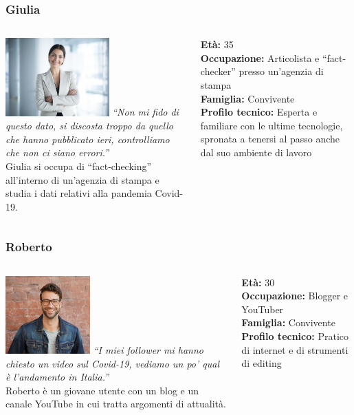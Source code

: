 \documentclass[handout]{beamer}
\begin{document}
		\begin{frame}
			\frametitle{Giulia}
			\begin{columns}[t]
				\begin{column}[T]{6cm}
					\includegraphics[height=3cm]{img/giulia}
					\textit{``Non mi fido di questo dato, si discosta troppo da quello che hanno pubblicato ieri, controlliamo che non ci siano errori.''}\\
					Giulia si occupa di ``fact-checking'' all'interno di un'agenzia di stampa e studia i dati relativi alla pandemia Covid-19.
				\end{column}
				\begin{column}[T]{5cm}
					\textbf{Età:} 35\\
					\textbf{Occupazione:} Articolista e ``fact-checker'' presso un'agenzia di stampa\\
					\textbf{Famiglia:} Convivente\\
					\textbf{Profilo tecnico:} Esperta e familiare con le ultime tecnologie, spronata a tenersi al passo anche dal suo ambiente di lavoro\\
				\end{column}
			\end{columns}
		\end{frame}

		\begin{frame}
			\frametitle{Roberto}
			\begin{columns}[t]
				\begin{column}[T]{6cm}
					\includegraphics[height=3cm]{img/francesco}
					\textit{``I miei follower mi hanno chiesto un video sul Covid-19, vediamo un po' qual è l'andamento in Italia.''}\\
					Roberto è un giovane utente con un blog e un canale YouTube in cui tratta argomenti di attualità.
				\end{column}
				\begin{column}[T]{5cm}
					\textbf{Età:} 30\\
					\textbf{Occupazione:} Blogger e YouTuber\\
					\textbf{Famiglia:} Convivente\\
					\textbf{Profilo tecnico:} Pratico di internet e di strumenti di editing\\
				\end{column}
			\end{columns}
		\end{frame}
\end{document}
